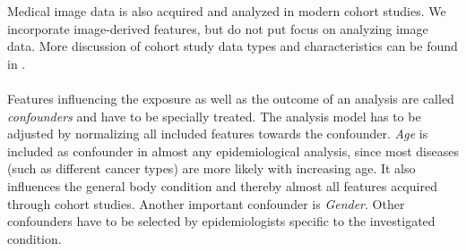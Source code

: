\documentclass[journal]{style/vgtc} 			          %
\newcommand{\com}[1]{\textcolor{orange}{\uline{#1}}}
\begin{document}
Medical image data is also acquired and analyzed in modern cohort studies.
We incorporate image-derived features, but do not put focus on analyzing image data.
More discussion of cohort study data types and characteristics can be found in \cite{Klemm2014VIS, Toennies2015, Preim2014}.
\\\\
Features influencing the exposure as well as the outcome of an analysis are called \emph{confounders} and have to be specially treated.
The analysis model has to be adjusted by normalizing all included features towards the confounder.
\emph{Age} is included as confounder in almost any epidemiological analysis, since most diseases (such as different cancer types) are more likely with increasing age.
It also influences the general body condition and thereby almost all features acquired through cohort studies.
Another important confounder is \emph{Gender}.
Other confounders have to be selected by epidemiologists specific to the investigated condition.
\end{document}
